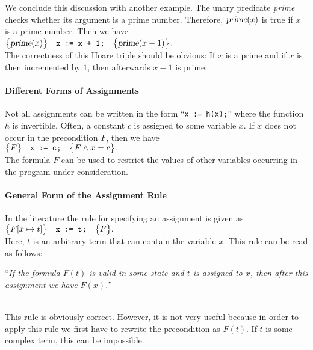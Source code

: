 We conclude this discussion with another example.  The unary predicate \textsl{prime} checks whether
its argument is a prime number.  Therefore, $\textsl{prime}(x)$ is true if $x$ is a prime number.
Then we have
\\[0.2cm]
\hspace*{1.3cm}
$\bigl\{\textsl{prime}(x)\bigr\}\quad\texttt{x := x + 1;}\quad\bigl\{\textsl{prime}(x-1)\bigr\}$.
\\[0.2cm]
The correctness of this Hoare triple should be obvious: If $x$ is a prime and if $x$ is then
incremented by $1$, then afterwards $x-1$ is prime.

\paragraph{Different Forms of Assignments}
Not all assignments can be written in the form ``\texttt{x := h(x);}'' where the function $h$ is invertible.
Often, a constant $c$ is assigned to some variable $x$.  If $x$ does not occur in the precondition
$F$, then we have
\\[0.2cm]
\hspace*{1.3cm}
$ \bigl\{F\bigr\}\quad\texttt{x := c;}\quad\bigl\{F \wedge x = c\bigr\}. $
\\[0.2cm]
The formula $F$ can be used to restrict the values of other variables occurring in the program under
consideration.


\paragraph{General Form of the Assignment Rule}
In the literature the rule for specifying an assignment is given as
\\[0.2cm]
\hspace*{1.3cm}
$ \bigl\{F[x \mapsto t]\bigr\}\quad\texttt{x := t;}\quad\bigl\{F\bigr\}. $
\\[0.2cm]
Here, $t$ is an arbitrary term that can contain the variable $x$.  This rule can be read as follows:
\\[0.2cm]
\hspace*{1.3cm}
\begin{minipage}[c]{0.8\linewidth}
``\emph{If the formula $F(t)$ is valid in some state and $t$ is assigned to $x$,
        then after this assignment we have $F(x)$.}'' 
\end{minipage}
\\[0.2cm]
This rule is obviously correct.  However, it is not very useful because in order to apply this rule 
we first have to rewrite the precondition as $F(t)$.  If $t$ is some complex term, this can be impossible.


